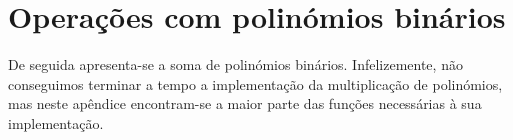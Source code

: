 \section{Operações com polinómios binários}
De seguida apresenta-se a soma de polinómios binários. Infelizemente, não conseguimos terminar a tempo a implementação da multiplicação de polinómios, mas neste apêndice encontram-se a maior parte das funções necessárias à sua implementação.
